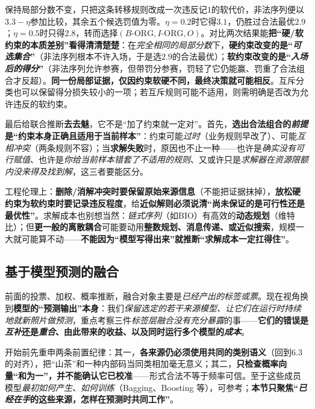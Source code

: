 保持局部分数不变，只把这条转移规则改成一次违反记$1$的软代价，非法序列便以$3.3-\eta$参加比较，其余五个候选罚值为零。$\eta=0.2$时它得$3.1$，仍胜过合法最优$2.9$；$\eta=0.5$时只得$2.8$，转而选择$(B\text{-ORG},I\text{-ORG},O)$。对比两次结果能\textbf{把“硬/软约束的本质差别”看得清清楚楚}：在\emph{完全相同的局部分数}下，\textbf{硬约束改变的是“\emph{可选集合}”}（非法序列根本不许入场，于是选$2.9$的合法最优）；\textbf{软约束改变的是“\emph{入场后的得分}”}（非法序列允许参赛，但带罚分参赛，罚轻了它仍能赢、罚重了合法组合才反超）。\textbf{同一份局部证据，仅因约束软硬不同，最终决策就可能相反}。互斥分类也可以保留得分损失较小的一项；若互斥规则可能不适用，则需明确是否改为允许违反的软约束。

最后给联合推断\textbf{去去魅}，它不是“加了约束就一定对”。首先，\textbf{选出合法组合的\emph{前提}是“约束本身正确且适用于当前样本”}：约束可能\emph{过时}（业务规则早改了）、可能\emph{互相冲突}（两条规则不容）；当\textbf{求解失败}时，原因也不止一种——也许是\emph{确实没有可行赋值}、也许是\emph{你给当前样本错套了不适用的规则}、又或许只是\emph{求解器在资源限额内没来得及找到解}，这三者要能区分。

工程伦理上：\textbf{删除/消解冲突时要保留原始来源信息}（不能把证据抹掉），\textbf{放松硬约束为软约束时要记录违反程度}，给\textbf{近似解则必须说清“尚未保证的是可行性还是最优性”}。求解成本也别想当然：\emph{链式序列}（如BIO）有高效的\textbf{动态规划}（维特比）；但\textbf{更一般的离散耦合}可能要动用\textbf{整数规划、消息传递、或近似搜索}，规模一大就可能算不动——\textbf{不能因为“模型写得出来”就推断“求解成本一定扛得住”}。

\subsection{基于模型预测的融合}
\label{sec:ket-integration-prediction}

前面的投票、加权、概率推断，融合对象主要是\emph{已经产出的标签或票}。现在视角换到\textbf{模型的“预测输出”本身}：我们\emph{保留选定的若干来源模型、让它们在运行时持续地就新照片做预测}，重点考察三件\emph{标签层融合没有充分暴露}的事——\textbf{它们的错误是\emph{互补}还是\emph{重合}、由此带来的收益、以及同时运行多个模型的\emph{成本}}。

开始前先重申两条前置纪律：其一，\textbf{各来源仍必须使用共同的类别语义}（回到6.3的对齐），把“山茶”和一种内部码当同类相加毫无意义；其二，\textbf{只检查概率向量“和为一”，并不能确认它已校准}——形式合法不等于频率可信。至于这些成员模型\emph{最初如何产生、如何训练}（Bagging、Boosting 等），可参考；\textbf{本节只聚焦“\emph{已经在手}的这些来源，怎样在预测时共同工作”}。

